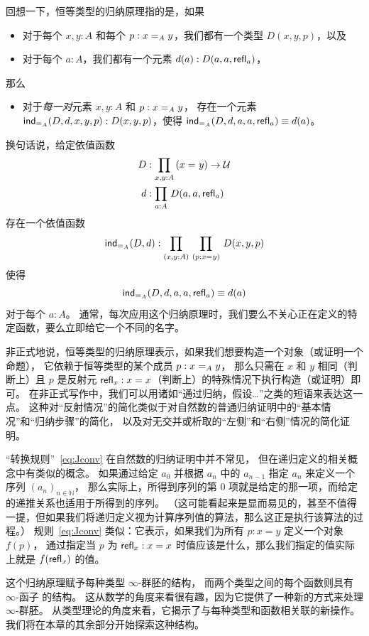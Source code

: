 回想一下，恒等类型的归纳原理指的是，如果
\begin{itemize}
\item 对于每个 $x,y:A$ 和每个 $p:\id[A]xy$，我们都有一个类型 $D(x,y,p)$，以及
\item 对于每个 $a:A$，我们都有一个元素 $d(a):D(a,a,\refl a)$，
\end{itemize}
那么
\begin{itemize}
\item 对于\emph{每一对}元素 $x,y:A$ 和 $p:\id[A]xy$，
存在一个元素 $\indid{A}(D,d,x,y,p):D(x,y,p)$，使得 $\indid{A}(D,d,a,a,\refl a) \jdeq d(a)$。
\end{itemize}
换句话说，给定依值函数
\begin{align*}
D & :\prd{x,y:A} (\id{x}{y}) \to \type\\
d & :\prd{a:A} D(a,a,\refl{a})
\end{align*}
存在一个依值函数
\[\indid{A}(D,d):\prd{x,y:A}{p:\id{x}{y}} D(x,y,p)\]
使得
\begin{equation}\label{eq:Jconv}
\indid{A}(D,d,a,a,\refl{a})\jdeq d(a)
\end{equation}
对于每个 $a:A$。
通常，每次应用这个归纳原理时，我们要么不关心正在定义的特定函数，要么立即给它一个不同的名字。

非正式地说，恒等类型的归纳原理表示，如果我们想要构造一个对象（或证明一个命题），
它依赖于恒等类型的某个成员 $p:\id[A]xy$，
那么只需在 $x$ 和 $y$ 相同（判断上）且 $p$ 是反射元 $\refl{x}:x=x$（判断上）的特殊情况下执行构造（或证明）即可。
在非正式写作中，我们可以用诸如“通过归纳，假设\dots”之类的短语来表达这一点。
这种对“反射情况”的简化类似于对自然数的普通归纳证明中的“基本情况”和“归纳步骤”的简化，
以及对无交并或析取的“左侧”和“右侧”情况的简化证明。%


“转换规则”~\eqref{eq:Jconv} 在自然数的归纳证明中并不常见，
但在递归定义的相关概念中有类似的概念。
如果通过给定 $a_0$ 并根据 $a_n$ 中的 $a_{n-1}$ 指定 $a_{n}$ 来定义一个序列 $(a_n)_{n\in \mathbb{N}}$，
那么实际上，所得到序列的第 $0$ 项就是给定的那一项，而给定的递推关系也适用于所得到的序列。
（这可能看起来是显而易见的，甚至不值得一提，但如果我们将递归定义视为计算序列值的算法，那么这正是执行该算法的过程。）
规则~\eqref{eq:Jconv} 类似：它表示，如果我们为所有 $p:x=y$ 定义一个对象 $f(p)$，
通过指定当 $p$ 为 $\refl{x}:x=x$ 时值应该是什么，那么我们指定的值实际上就是 $f(\refl{x})$ 的值。

这个归纳原理赋予每种类型 $\infty$-群胚的结构，
而两个类型之间的每个函数则具有 $\infty$-函子 的结构。 
这从数学的角度来看很有趣，因为它提供了一种新的方式来处理 $\infty$-群胚。
从类型理论的角度来看，它揭示了与每种类型和函数相关联的新操作。 
我们将在本章的其余部分开始探索这种结构。


